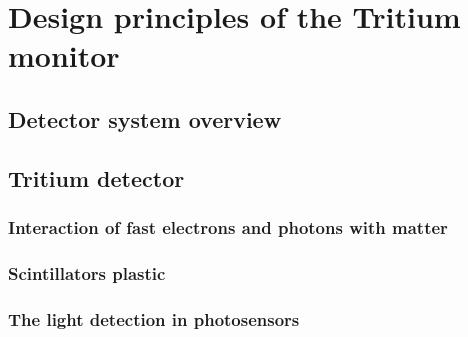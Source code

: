 \documentclass[12pt,a4paper]{book}
\begin{document}
\chapter[Design principles]{Design principles of the Tritium monitor}\label{chap:DesignPrinciples}
	\section{Detector system overview}
	 \label{sec:MonitorOverview}
	\newpage
	
	\section{Tritium detector}
	 \label{sec:TritiumDectectorIntro}
	\newpage
	
		\subsection[Interaction of particles with matter]{Interaction of fast electrons and photons with matter}
		 \label{subsec:Interaction}
					
		\subsection{Scintillators plastic} %
		\label{subsec:PlasticScintillators}
		
			
		\subsection{The light detection in photosensors} %
		\label{subsec:Photosensors}
	
\end{document}

